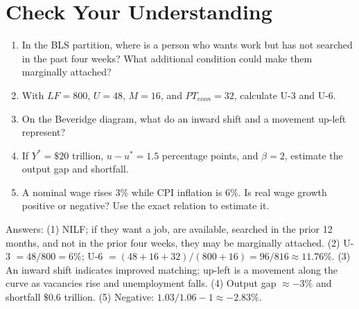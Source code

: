 \documentclass[11pt,letterpaper]{article}
\begin{document}
\section{Check Your Understanding}
\begin{enumerate}
  \item In the BLS partition, where is a person who wants work but has not searched in the past four weeks? What additional condition could make them marginally attached?
  \item With $LF=800$, $U=48$, $M=16$, and $PT_{econ}=32$, calculate U-3 and U-6.
  \item On the Beveridge diagram, what do an inward shift and a movement up-left represent?
  \item If $Y^*=\$20$ trillion, $u-u^*=1.5$ percentage points, and $\beta=2$, estimate the output gap and shortfall.
  \item A nominal wage rises 3\% while CPI inflation is 6\%. Is real wage growth positive or negative? Use the exact relation to estimate it.
\end{enumerate}
Answers: (1) NILF; if they want a job, are available, searched in the prior 12 months, and not in the prior four weeks, they may be marginally attached. (2) U-3 $=48/800=6\%$; U-6 $=(48+16+32)/(800+16)=96/816\approx11.76\%$. (3) An inward shift indicates improved matching; up-left is a movement along the curve as vacancies rise and unemployment falls. (4) Output gap $\approx-3\%$ and shortfall $\$0.6$ trillion. (5) Negative: $1.03/1.06-1\approx-2.83\%$.
\end{document}
